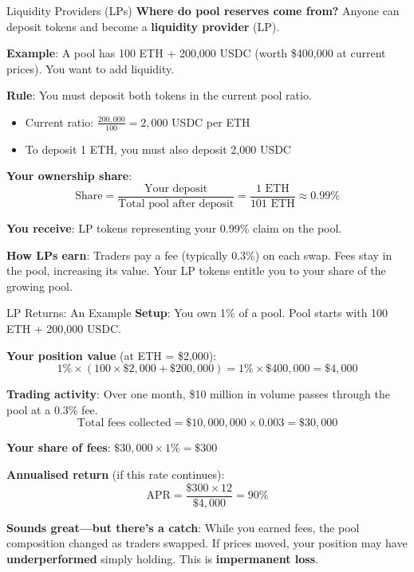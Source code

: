 \documentclass[10pt]{beamer}
\newcommand{\highlight}[1]{\textcolor{AccentOrange}{\textbf{#1}}}
\begin{document}
\begin{frame}{Liquidity Providers (LPs)}
  \textbf{Where do pool reserves come from?} Anyone can deposit tokens and become a \highlight{liquidity provider} (LP).
  
  \vspace{0.5em}
  \textbf{Example}: A pool has 100 ETH + 200,000 USDC (worth \$400,000 at current prices). You want to add liquidity.
  
  \vspace{0.5em}
  \textbf{Rule}: You must deposit both tokens in the current pool ratio.
  \begin{itemize}
    \item Current ratio: $\frac{200{,}000}{100} = 2{,}000$ USDC per ETH
    \item To deposit 1 ETH, you must also deposit 2,000 USDC
  \end{itemize}
  
  \vspace{0.5em}
  \textbf{Your ownership share}:
  \[
  \text{Share} = \frac{\text{Your deposit}}{\text{Total pool after deposit}} = \frac{1 \text{ ETH}}{101 \text{ ETH}} \approx 0.99\%
  \]
  
  \vspace{0.5em}
  \textbf{You receive}: LP tokens representing your 0.99\% claim on the pool.
  
  \vspace{0.5em}
  \textbf{How LPs earn}: Traders pay a fee (typically 0.3\%) on each swap. Fees stay in the pool, increasing its value. Your LP tokens entitle you to your share of the growing pool.
\end{frame}

\begin{frame}{LP Returns: An Example}
  \textbf{Setup}: You own 1\% of a pool. Pool starts with 100 ETH + 200,000 USDC.
  
  \vspace{0.5em}
  \textbf{Your position value} (at ETH = \$2,000):
  \[
  1\% \times (100 \times \$2{,}000 + \$200{,}000) = 1\% \times \$400{,}000 = \$4{,}000
  \]
  
  \vspace{0.5em}
  \textbf{Trading activity}: Over one month, \$10 million in volume passes through the pool at a 0.3\% fee.
  \[
  \text{Total fees collected} = \$10{,}000{,}000 \times 0.003 = \$30{,}000
  \]
  
  \vspace{0.5em}
  \textbf{Your share of fees}: $\$30{,}000 \times 1\% = \$300$
  
  \vspace{0.5em}
  \textbf{Annualised return} (if this rate continues):
  \[
  \text{APR} = \frac{\$300 \times 12}{\$4{,}000} = 90\%
  \]
  
  \vspace{0.5em}
  \textbf{Sounds great---but there's a catch}: While you earned fees, the pool composition changed as traders swapped. If prices moved, your position may have \highlight{underperformed} simply holding. This is \highlight{impermanent loss}.
\end{frame}
\end{document}
